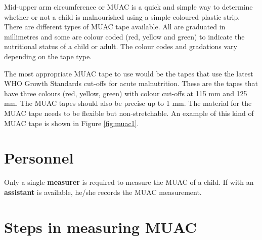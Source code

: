 \documentclass[
  12pt,
]{book}
\begin{document}
Mid-upper arm circumference or MUAC is a quick and simple way to determine whether or not a child is malnourished using a simple coloured plastic strip. There are different types of MUAC tape available. All are graduated in millimetres and some are colour coded (red, yellow and green) to indicate the nutritional status of a child or adult. The colour codes and gradations vary depending on the tape type.

The most appropriate MUAC tape to use would be the tapes that use the latest WHO Growth Standards cut-offs for acute malnutrition. These are the tapes that have three colours (red, yellow, green) with colour cut-offs at 115 mm and 125 mm. The MUAC tapes should also be precise up to 1 mm. The material for the MUAC tape needs to be flexible but non-stretchable. An example of this kind of MUAC tape is shown in Figure \ref{fig:muac1}.

\hypertarget{personnel-2}{%
\section{Personnel}\label{personnel-2}}

Only a single \textbf{measurer} is required to measure the MUAC of a child. If with an \textbf{assistant} is available, he/she records the MUAC measurement.

\hypertarget{steps-in-measuring-muac}{%
\section{Steps in measuring MUAC}\label{steps-in-measuring-muac}}
\end{document}
